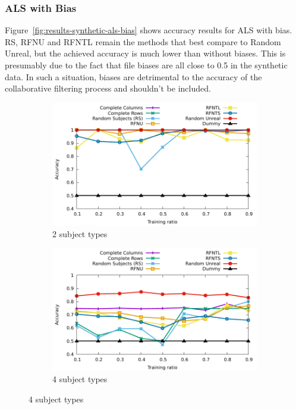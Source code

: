 \documentclass[10pt, conference, compsocconf]{IEEEtran}
\begin{document}
\subsubsection{ALS with Bias}

Figure~\ref{fig:results-synthetic-als-bias} shows accuracy results for 
ALS with bias. RS, RFNU and RFNTL remain the methods that best compare 
to Random Unreal, but the achieved accuracy is much lower than without 
biases. This is presumably due to 
the fact that file biases are all close to 0.5 in the synthetic data. 
In such a situation, biases are detrimental to the accuracy of the 
collaborative filtering process and shouldn't be included.

\begin{figure}
\begin{subfigure}[b]{\columnwidth}
        \includegraphics[width=0.8\columnwidth]{data/results/means_of_results/ALS-Bias/Synthetic/synthetic_subject_types/ALS-Bias-2-types.pdf}
        \caption{2 subject types}
\end{subfigure}
\begin{subfigure}[b]{\columnwidth}
        \includegraphics[width=0.8\columnwidth]{data/results/means_of_results/ALS-Bias/Synthetic/synthetic_subject_types/ALS-Bias-4-types.pdf}
        \caption{4 subject types}
\end{subfigure}

\end{figure}
\end{document}
